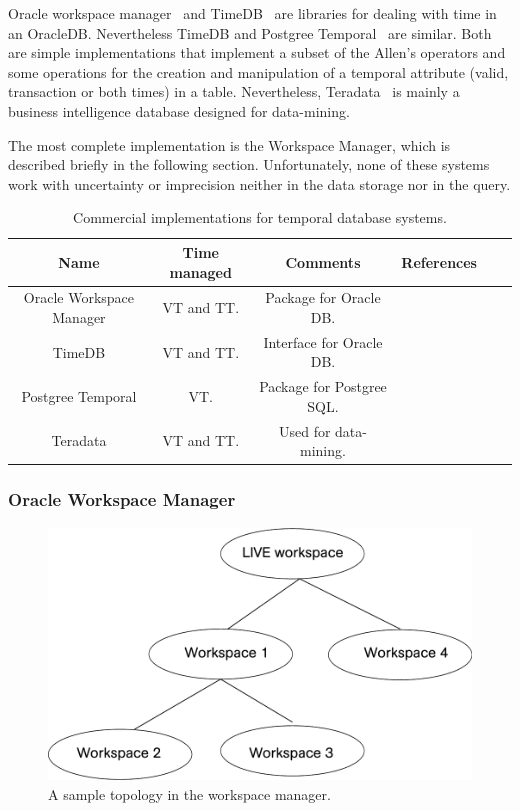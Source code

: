 Oracle workspace manager~\cite{oracle2009} and TimeDB~\cite{timedb2005} are libraries for dealing with time in an OracleDB. Nevertheless TimeDB and Postgree Temporal~\cite{posgree2009} are similar. Both are simple implementations that implement a subset of the Allen's operators and some operations for the creation and manipulation of a temporal attribute (valid, transaction or both times) in a table. Nevertheless, Teradata~\cite{teradata2011} is mainly a business intelligence database designed for data-mining. 

The most complete implementation is the Workspace Manager, which is described briefly in the following section. Unfortunately, none of these systems work with uncertainty or imprecision neither in the data storage nor in the query.

\begin{table}
\centering
\caption{Commercial implementations for temporal database systems. }
\begin{tabular}{c c c c c c }
\hline
\textbf{Name} & \textbf{Time managed} & \textbf{Comments} & \textbf{References}  \\ \hline
Oracle Workspace Manager & VT and TT. & Package for Oracle DB. & \cite{oracle2009}\\
TimeDB & VT and TT. & Interface for Oracle DB. & \cite{timedb2005}\\
Postgree Temporal & VT. & Package for Postgree SQL. & \cite{posgree2009}\\
Teradata & VT and TT. & Used for data-mining. & \cite{teradata2011}\\
\hline 
\end{tabular}
\label{table:commercial-temporal-db}



\end{table}

\subsubsection{Oracle Workspace Manager}

\begin{figure}
\centering
\includegraphics[scale=0.5]{graphs/workspaceTopology.pdf}
\caption{A sample topology in the workspace manager.}
\label{fig:workspace-topology}
\end{figure}

